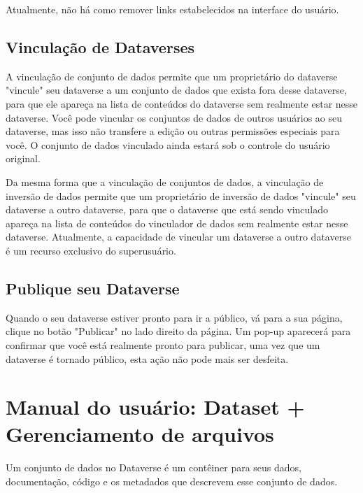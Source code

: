 \documentclass[12pt,hidelinks]{article}
\begin{document}
Atualmente, não há como remover links estabelecidos na interface do usuário.
    
    \subsection{Vinculação de Dataverses}
    
\qquad A vinculação de conjunto de dados permite que um proprietário do dataverse "vincule" seu dataverse a um conjunto de dados que exista fora desse dataverse, para que ele apareça na lista de conteúdos do dataverse sem realmente estar nesse dataverse. Você pode vincular os conjuntos de dados de outros usuários ao seu dataverse, mas isso não transfere a edição ou outras permissões especiais para você. O conjunto de dados vinculado ainda estará sob o controle do usuário original.

Da mesma forma que a vinculação de conjuntos de dados, a vinculação de inversão de dados permite que um proprietário de inversão de dados "vincule" seu dataverse a outro dataverse, para que o dataverse que está sendo vinculado apareça na lista de conteúdos do vinculador de dados sem realmente estar nesse dataverse. Atualmente, a capacidade de vincular um dataverse a outro dataverse é um recurso exclusivo do superusuário.

    \subsection{Publique seu Dataverse}
    
\qquad Quando o seu dataverse estiver pronto para ir a público, vá para a sua página, clique no botão "Publicar" no lado direito da página. Um pop-up aparecerá para confirmar que você está realmente pronto para publicar, uma vez que um dataverse é tornado público, esta ação não pode mais ser desfeita.

\newpage

\section{Manual do usuário: Dataset + Gerenciamento de arquivos}
\vspace{10.0cm}

\qquad Um conjunto de dados no Dataverse é um contêiner para seus dados, documentação, código e os metadados que descrevem esse conjunto de dados.
\end{document}
